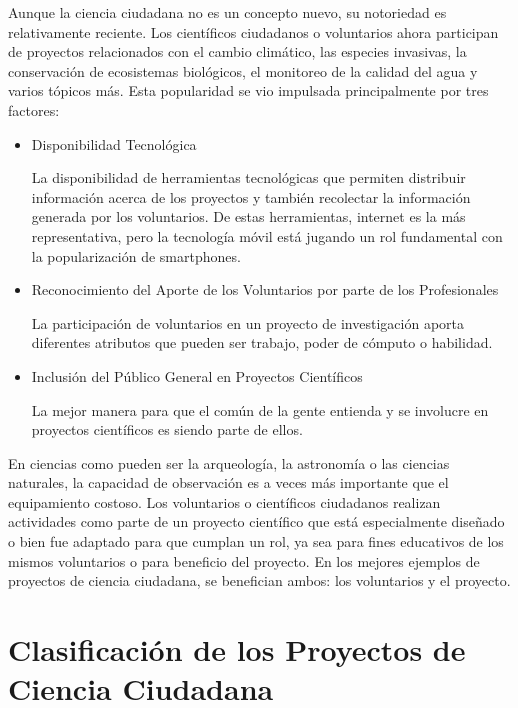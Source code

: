 	Aunque la ciencia ciudadana no es un concepto nuevo, su notoriedad es relativamente reciente. Los científicos ciudadanos o voluntarios ahora participan de proyectos relacionados con el cambio climático, las especies invasivas, la conservación de ecosistemas biológicos, el monitoreo de la calidad del agua y varios tópicos más. Esta popularidad se vio impulsada principalmente por tres factores:

\begin{itemize}
	\item {Disponibilidad Tecnológica}
	
	La disponibilidad de herramientas tecnológicas que permiten distribuir información acerca de los proyectos y también recolectar la información generada por los voluntarios. De estas herramientas, internet es la más representativa, pero la tecnología móvil está jugando un rol fundamental con la popularización de smartphones. \cite{silvertown2009new}	
	\item {Reconocimiento del Aporte de los Voluntarios por parte de los Profesionales}
	
	La participación de voluntarios en un proyecto de investigación aporta diferentes atributos que pueden ser trabajo, poder de cómputo o habilidad. \cite{cohn2008citizen}
	\item {Inclusión del Público General en Proyectos Científicos}
	
	La mejor manera para que el común de la gente entienda y se involucre en proyectos científicos es siendo parte de ellos. \cite{silvertown2009new}
\end{itemize} 

	En ciencias como pueden ser la arqueología, la astronomía o las ciencias naturales, la capacidad de observación es a veces más importante que el equipamiento costoso. Los voluntarios o científicos ciudadanos realizan actividades como parte de un proyecto científico que está especialmente diseñado o bien fue adaptado para que cumplan un rol, ya sea para fines educativos de los mismos voluntarios o para beneficio del proyecto. En los mejores ejemplos de proyectos de ciencia ciudadana, se benefician ambos: los voluntarios y el proyecto.\cite{silvertown2009new}


\section{Clasificación de los Proyectos de Ciencia Ciudadana} \label{sec:clasificacion_proyectos_cc}
	
